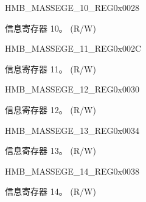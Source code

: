 \begin{register}{H}{MB\_MASSEGE\_10\_REG}{0x0028}\label{regdesc:MBMESSAGE10REG}
%
\regnewline%
\begin{regdesc}\begin{reglist}
\label{fielddesc:MBMESSAGE10}\item [MB\_MASSEGE\_10] 信息寄存器 10。 (R/W)
\end{reglist}\end{regdesc}
\end{register}


\begin{register}{H}{MB\_MASSEGE\_11\_REG}{0x002C}\label{regdesc:MBMESSAGE11REG}
%
\regnewline%
\begin{regdesc}\begin{reglist}
\label{fielddesc:MBMESSAGE11}\item [MB\_MASSEGE\_11] 信息寄存器 11。 (R/W)
\end{reglist}\end{regdesc}
\end{register}


\begin{register}{H}{MB\_MASSEGE\_12\_REG}{0x0030}\label{regdesc:MBMESSAGE12REG}
%
\regnewline%
\begin{regdesc}\begin{reglist}
\label{fielddesc:MBMESSAGE12}\item [MB\_MASSEGE\_12] 信息寄存器 12。 (R/W)
\end{reglist}\end{regdesc}
\end{register}


\begin{register}{H}{MB\_MASSEGE\_13\_REG}{0x0034}\label{regdesc:MBMESSAGE13REG}
%
\regnewline%
\begin{regdesc}\begin{reglist}
\label{fielddesc:MBMESSAGE13}\item [MB\_MASSEGE\_13] 信息寄存器 13。 (R/W)
\end{reglist}\end{regdesc}
\end{register}


\begin{register}{H}{MB\_MASSEGE\_14\_REG}{0x0038}\label{regdesc:MBMESSAGE14REG}
%
\regnewline%
\begin{regdesc}\begin{reglist}
\label{fielddesc:MBMESSAGE14}\item [MB\_MASSEGE\_14] 信息寄存器 14。 (R/W)
\end{reglist}\end{regdesc}
\end{register}


